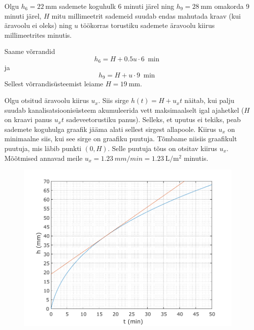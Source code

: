 \documentclass[10pt]{article}
\begin{document}
Olgu $h_6=\SI{22}{\mm}$ sademete koguhulk 6 minuti järel ning $h_9=\SI{28}{\mm}$ omakorda 9 minuti järel, $H$ mitu millimeetrit sademeid suudab endas mahutada kraav (kui äravoolu ei oleks) ning $u$ töökorras torustiku sademete äravoolu kiirus millimeetrites minutis.

Saame võrrandid
\[
h_6 = H +0.5 u \cdot \SI{6}{\min}
\]
ja
\[
h_9 = H + u \cdot \SI{9}{\min}
\]
Sellest võrrandisüsteemist leiame $H=\SI{19}{\mm}$.

Olgu otsitud äravoolu kiirus $u_x$. Siis sirge $h(t)=H+u_xt$ näitab, kui palju suudab kanalisatsioonisüsteem akumuleerida vett maksimaalselt igal ajahetkel ($H$ on kraavi panus $u_xt$ sadeveetorustiku panus). Selleks, et uputus ei tekiks, peab sademete koguhulga graafik jääma alati sellest sirgest allapoole. Kiirus $u_x$ on minimaalne siis, kui see sirge on graafiku puutuja. Tõmbame niisiis graafikult puutuja, mis läbib punkti $(0,H)$. Selle puutuja tõus on otsitav kiirus $u_x$. Mõõtmised annavad meile $u_x=\SI{1.23}{mm/min}=\SI{1.23}{\L\per\m\squared}$ minutis.

\begin{figure}[h]
	\vspace{-1em}
    \centering
    \includegraphics[width=0.75\linewidth]{2022-v3g-07-yl.pdf}
\end{figure}
\probend
\bigskip

\end{document}
